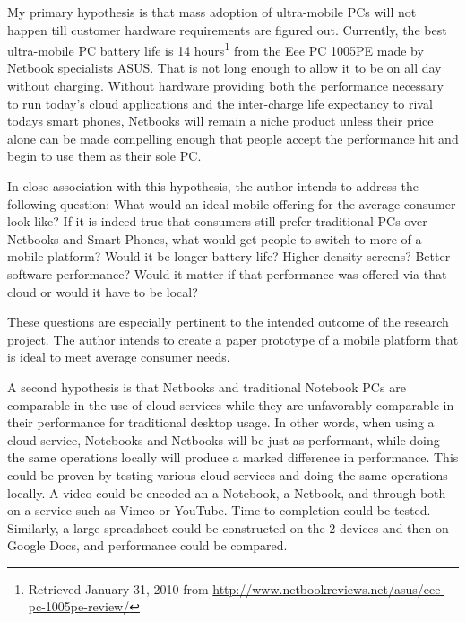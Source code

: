My primary hypothesis is that mass adoption of ultra-mobile PCs will not happen
till customer hardware requirements are figured out.  Currently, the best
ultra-mobile PC battery life is 14 hours\footnote{Retrieved January 31, 2010
from \url{http://www.netbookreviews.net/asus/eee-pc-1005pe-review/}}                 %
from the Eee PC 1005PE made by Netbook specialists ASUS.  That is not long           %
enough to allow it to be on all day without charging.  Without hardware              %
providing both the performance necessary to run today's cloud applications and       %
the inter-charge life expectancy to rival todays smart phones, Netbooks will
remain a niche product unless their price alone can be made compelling enough
that people accept the performance hit and begin to use them as their sole PC.

In close association with this hypothesis, the author intends to address the
following question: What would an ideal mobile offering for the average consumer
look like?  If it is indeed true that consumers still prefer traditional PCs
over Netbooks and Smart-Phones, what would get people to switch to more of a
mobile platform?  Would it be longer battery life?  Higher density screens?
Better software performance?  Would it matter if that performance was offered
via that cloud or would it have to be local?

These questions are especially pertinent to the intended outcome of the research
project.  The author intends to create a paper prototype of a mobile platform
that is ideal to meet average consumer needs.

A second hypothesis is that Netbooks and traditional Notebook PCs are comparable
in the use of cloud services while they are unfavorably comparable in their
performance for traditional desktop usage.  In other words, when using a cloud
service, Notebooks and Netbooks will be just as performant, while doing the same
operations locally will produce a marked difference in performance.  This could
be proven by testing various cloud services and doing the same operations
locally.  A video could be encoded an a Notebook, a Netbook, and through both on
a service such as Vimeo or YouTube.  Time to completion could be
tested. Similarly, a large spreadsheet could be constructed on the 2 devices and
then on Google Docs, and performance could be compared.
